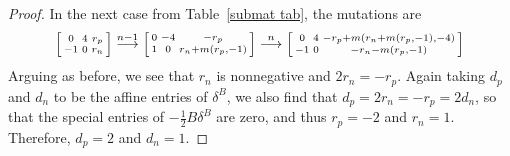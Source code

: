 \documentclass{amsart}
\theoremstyle{definition}
\theoremstyle{remark}
\numberwithin{equation}{section}
\newcommand{\0}{{\mathbf{0}}}
\begin{document}
\begin{proof}
In the next case from Table~\ref{submat tab}, the mutations are
\[\begin{bsmallmatrix*}
0 & 4 & r_p\\
-1 & 0 &r_n
\end{bsmallmatrix*}\overset{n-1}{\longrightarrow}
\begin{bsmallmatrix*}
0 & -4 & -r_p\\
1 & 0 &r_n+m(r_p,-1)
\end{bsmallmatrix*}\overset{n}{\longrightarrow}
\begin{bsmallmatrix*}
0 & 4 &-r_p+m(r_n+m(r_p,-1),-4)\\
-1 & 0 &-r_n-m(r_p,-1)
\end{bsmallmatrix*}
\]
Arguing as before, we see that $r_n$ is nonnegative and $2r_n=-r_p$.
Again taking $d_p$ and $d_n$ to be the affine entries of $\delta^B$, we also find that $d_p=2r_n=-r_p=2d_n$, so that the special entries of $-\frac12B\delta^B$ are zero, and thus $r_p=-2$ and $r_n=1$.
Therefore,
$d_p=2$ and $d_n=1$.


\end{proof}
\end{document}
